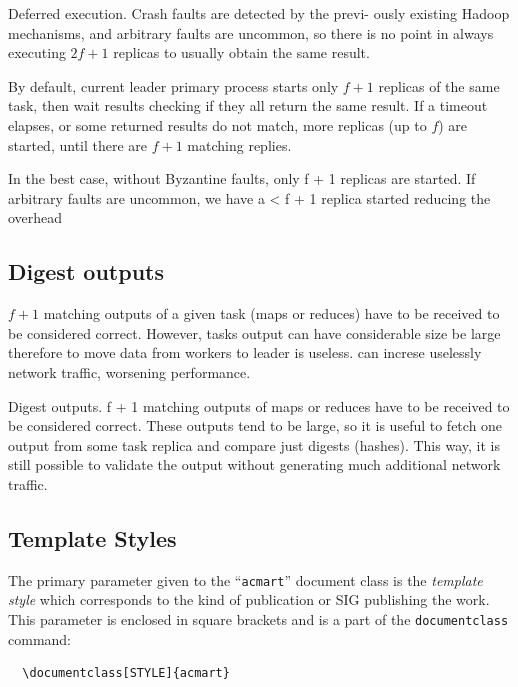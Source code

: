 \documentclass[sigchi]{acmart}
\begin{document}
Deferred execution. Crash faults are detected by the previ-
ously existing Hadoop mechanisms, and arbitrary faults are
uncommon, so there is no point in always executing $2f + 1$ replicas to usually obtain the same result.




By default, current leader primary process starts only $f + 1$ replicas of the same task, then wait results checking if they all return the same result. If a timeout elapses, or some returned results do not match, more replicas (up to $f$) are started, until there are $f + 1$ matching replies.



In the best case, without Byzantine faults, only f + 1 replicas are started. If arbitrary faults are uncommon, we have a < f + 1 replica started reducing the overhead 





\subsection{Digest outputs} $f + 1$ matching outputs of a given task (maps or reduces) have to be received to be considered correct. However, tasks output can have considerable size be large therefore to move data from workers to leader is useless. can increse uselessly network traffic, worsening performance.


Digest outputs. f + 1 matching outputs of maps or reduces
have to be received to be considered correct. These outputs
tend to be large, so it is useful to fetch one output from some
task replica and compare just digests (hashes). This way, it is
still possible to validate the output without generating much
additional network traffic.






\subsection{Template Styles}

The primary parameter given to the ``\verb|acmart|'' document class is
the {\itshape template style} which corresponds to the kind of publication
or SIG publishing the work. This parameter is enclosed in square
brackets and is a part of the {\verb|documentclass|} command:
\begin{verbatim}
  \documentclass[STYLE]{acmart}
\end{verbatim}
\end{document}
